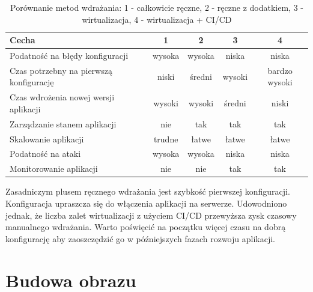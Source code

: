\documentclass{article}
\begin{document}
\begin{table}[H]
\centering
\begin{tabular}{|l|c|c|c|c|}
\hline
\textbf{Cecha} & \textbf{1} & \textbf{2} & \textbf{3} & \textbf{4} \\ \hline
Podatność na błędy konfiguracji         & \cellcolor{red!50}wysoka & \cellcolor{red!50}wysoka & \cellcolor{green!50}niska & \cellcolor{green!50}niska \\ \hline
Czas potrzebny na pierwszą konfigurację & \cellcolor{green!50}niski & \cellcolor{yellow!50}średni & \cellcolor{red!50}wysoki & \cellcolor{red!50}bardzo wysoki \\ \hline
Czas wdrożenia nowej wersji aplikacji   & \cellcolor{red!50}wysoki & \cellcolor{red!50}wysoki & \cellcolor{yellow!50}średni & \cellcolor{green!50}niski \\ \hline
Zarządzanie stanem aplikacji            & \cellcolor{red!50}nie & \cellcolor{green!50}tak & \cellcolor{green!50}tak & \cellcolor{green!50}tak \\ \hline
Skalowanie aplikacji                    & \cellcolor{red!50}trudne & \cellcolor{green!50}łatwe & \cellcolor{green!50}łatwe & \cellcolor{green!50}łatwe \\ \hline
Podatność na ataki                      & \cellcolor{red!50}wysoka & \cellcolor{red!50}wysoka & \cellcolor{green!50}niska & \cellcolor{green!50}niska \\ \hline
Monitorowanie aplikacji                 & \cellcolor{red!50}nie & \cellcolor{red!50}nie & \cellcolor{green!50}tak & \cellcolor{green!50}tak \\ \hline
\end{tabular}
\caption{Porównanie metod wdrażania: 1 - całkowicie ręczne, 2 - ręczne z dodatkiem, 3 - wirtualizacja, 4 - wirtualizacja + CI/CD}
\label{tab:porownanie-metod-wdrazania}
\end{table}

Zasadniczym plusem ręcznego wdrażania jest szybkość pierwszej konfiguracji. Konfiguracja upraszcza się do włączenia aplikacji na serwerze. Udowodniono jednak, że liczba zalet wirtualizacji z użyciem CI/CD przewyższa zysk czasowy manualnego wdrażania. Warto poświęcić na początku więcej czasu na dobrą konfigurację aby zaoszczędzić go w późniejszych fazach rozwoju aplikacji.


\section{Budowa obrazu} \label{sectionBudowaObrazu}
\end{document}
